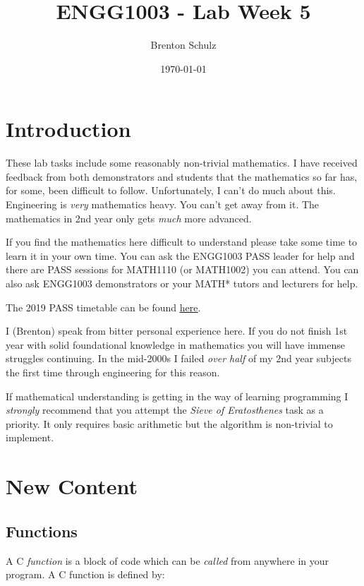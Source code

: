 \documentclass{lab}
\title{ENGG1003 - Lab Week 5}
\author{Brenton Schulz}
\date{\today}
\begin{document}
\maketitle

\section{Introduction}

These lab tasks include some reasonably non-trivial mathematics. I have received feedback from both demonstrators and students that the mathematics so far has, for some, been difficult to follow. Unfortunately, I can't do much about this. Engineering is \textit{very} mathematics heavy. You can't get away from it. The mathematics in 2nd year only gets \textit{much} more advanced.

If you find the mathematics here difficult to understand please take some time to learn it in your own time. You can ask the ENGG1003 PASS leader for help and there are PASS sessions for MATH1110 (or MATH1002) you can attend. You can also ask ENGG1003 demonstrators or your MATH* tutors and lecturers for help.

The 2019 PASS timetable can be found \underline{\href{https://www.newcastle.edu.au/__data/assets/pdf_file/0003/137577/PASS-TT-Callaghan-S1-19.pdf}{here}}.

I (Brenton) speak from bitter personal experience here. If you do not finish 1st year with solid foundational knowledge in mathematics you will have immense struggles continuing. In the mid-2000s I failed \textit{over half} of my 2nd year subjects the first time through engineering for this reason.

If mathematical understanding is getting in the way of learning programming I \textit{strongly} recommend that you attempt the \textit{Sieve of Eratosthenes} task as a priority. It only requires basic arithmetic but the algorithm is non-trivial to implement.%

\pagebreak
\section{New Content}

\subsection{Functions}

A C \textit{function} is a block of code which can be \textit{called} from anywhere in your program. A C function is defined by:
\end{document}
